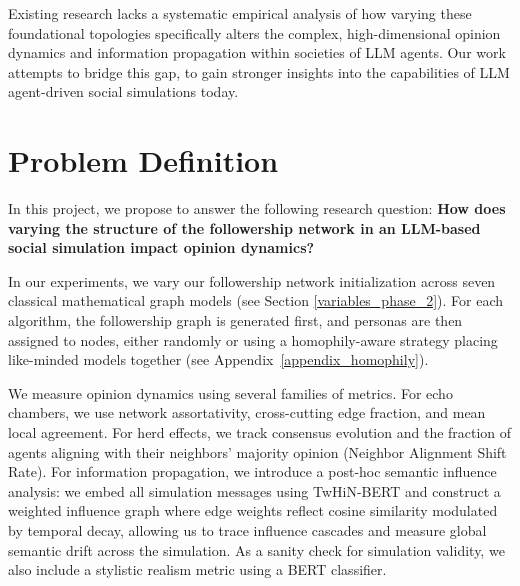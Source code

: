 \documentclass[11pt]{article}
\begin{document}

Existing research lacks a systematic empirical analysis of how varying these foundational topologies
specifically alters the complex, high-dimensional opinion dynamics and information propagation within societies of LLM agents. Our work attempts to bridge this gap, to gain stronger insights into the capabilities of LLM agent-driven social simulations today.

\section{Problem Definition}

In this project, we propose to answer the following research question: \textbf{How does varying the structure of the followership network in an LLM-based social simulation impact opinion dynamics?}

In our experiments, we vary our followership network initialization across seven classical mathematical graph models (see Section \ref{variables_phase_2}). For each algorithm, the followership graph is generated first, and personas are then assigned to nodes, either randomly or using a homophily-aware strategy placing like-minded models together (see Appendix~\ref{appendix_homophily}).

We measure opinion dynamics using several families of metrics. For echo chambers, we use network assortativity, cross-cutting edge fraction, and mean local agreement. For herd effects, we track consensus evolution and the fraction of agents aligning with their neighbors' majority opinion (Neighbor Alignment Shift Rate). For information propagation, we introduce a post-hoc semantic influence analysis: we embed all simulation messages using TwHiN-BERT \cite{zhang2023twhinbertsociallyenrichedpretrainedlanguage} and construct a weighted influence graph where edge weights reflect cosine similarity modulated by temporal decay, allowing us to trace influence cascades and measure global semantic drift across the simulation. As a sanity check for simulation validity, we also include a stylistic realism metric using a BERT classifier.
\end{document}

